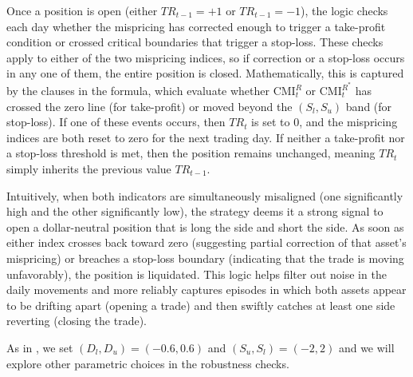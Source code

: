 Once a position is open (either \(TR_{t-1} = +1\) or \(TR_{t-1} = -1\)), the logic checks each day whether the mispricing has corrected enough to trigger a take-profit condition or crossed critical boundaries that trigger a stop-loss. These checks apply to either of the two mispricing indices, so if correction or a stop-loss occurs in any one of them, the entire position is closed. Mathematically, this is captured by the  clauses in the formula, which evaluate whether \(\mathrm{CMI}_t^R\) or \(\mathrm{CMI}_t^{R^*}\) has crossed the zero line (for take-profit) or moved beyond the \((S_l, S_u)\) band (for stop-loss). If one of these events occurs, then \(TR_t\) is set to \(0\), and the mispricing indices are both reset to zero for the next trading day. 
If neither a take-profit nor a stop-loss threshold is met, then the position remains unchanged, meaning \(TR_t\) simply inherits the previous value \(TR_{t-1}\).

Intuitively, when both indicators are simultaneously misaligned (one significantly high and the other significantly low), the strategy deems it a strong signal to open a dollar-neutral position that is long the  side and short the  side. As soon as either index crosses back toward zero (suggesting partial correction of that asset's mispricing) or breaches a stop-loss boundary (indicating that the trade is moving unfavorably), the position is liquidated. This  logic helps filter out noise in the daily movements and more reliably captures episodes in which both assets appear to be drifting apart (opening a trade) and then swiftly catches at least one side reverting (closing the trade).

As in \cite{Xie2016}, we set $(D_l, D_u)=(-0.6,0.6)$ and $(S_u,S_l)=(-2,2)$ and we will explore other parametric choices in the robustness checks.


